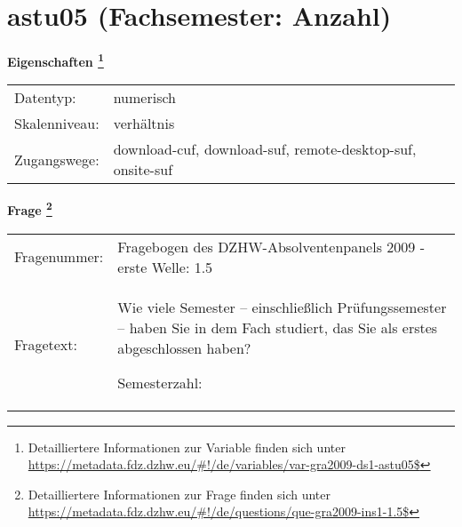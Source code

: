 
    \setcounter{footnote}{0}

    \vspace*{-1.8cm}
	\section{astu05 (Fachsemester: Anzahl)}
	\label{section:astu05}



    \vspace*{0.5cm}
    \noindent\textbf{Eigenschaften
	\footnote{Detailliertere Informationen zur Variable finden sich unter
		\url{https://metadata.fdz.dzhw.eu/\#!/de/variables/var-gra2009-ds1-astu05$}}}\\
	\begin{tabularx}{\hsize}{@{}lX}
	Datentyp: & numerisch \\
	Skalenniveau: & verhältnis \\
	Zugangswege: &
	  download-cuf, 
	  download-suf, 
	  remote-desktop-suf, 
	  onsite-suf
 \\
    \end{tabularx}



				\vspace*{0.5cm}
                \noindent\textbf{Frage
	                \footnote{Detailliertere Informationen zur Frage finden sich unter
		              \url{https://metadata.fdz.dzhw.eu/\#!/de/questions/que-gra2009-ins1-1.5$}}}\\
				\begin{tabularx}{\hsize}{@{}lX}
					Fragenummer: &
					  Fragebogen des DZHW-Absolventenpanels 2009 - erste Welle:
					  1.5
 \\
					Fragetext: & Wie viele Semester – einschließlich Prüfungssemester – haben Sie in dem Fach studiert, das Sie als erstes abgeschlossen haben?\par  Semesterzahl: \\
				\end{tabularx}





